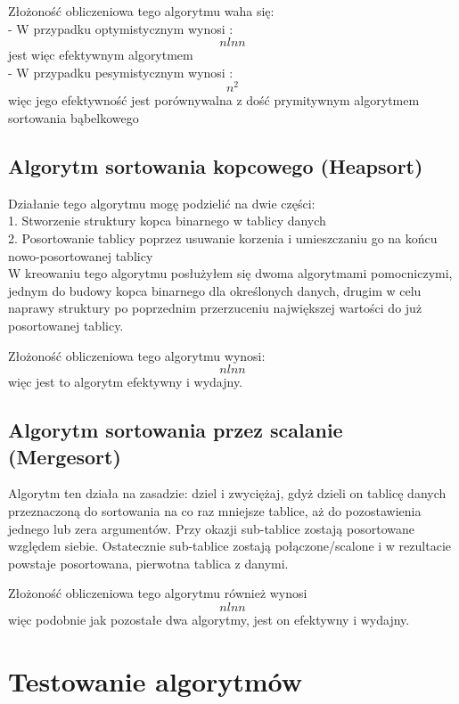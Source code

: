 \documentclass[a4paper,12pt]{article}
\begin{document}
Złożoność obliczeniowa tego algorytmu waha się: \\
- W przypadku optymistycznym wynosi : \begin{equation*}n ln n \end{equation*} jest więc efektywnym algorytmem \\
- W przypadku pesymistycznym wynosi : \begin{equation*} n^2 \end{equation*} więc jego efektywność jest porównywalna z dość prymitywnym algorytmem sortowania bąbelkowego

\subsection{Algorytm sortowania kopcowego (Heapsort)}

Działanie tego algorytmu mogę podzielić na dwie części: \\
1. Stworzenie struktury kopca binarnego w tablicy danych\\
2. Posortowanie tablicy poprzez usuwanie korzenia i umieszczaniu go na końcu nowo-posortowanej tablicy\\

W kreowaniu tego algorytmu posłużyłem się dwoma algorytmami pomocniczymi, jednym do budowy kopca binarnego dla określonych danych, drugim w celu naprawy struktury
po poprzednim przerzuceniu największej wartości do już posortowanej tablicy.

Złożoność obliczeniowa tego algorytmu wynosi: \[n ln n\] więc jest to algorytm efektywny i wydajny.

\subsection{Algorytm sortowania przez scalanie (Mergesort)}

Algorytm ten działa na zasadzie: dziel i zwyciężaj, gdyż dzieli on tablicę danych przeznaczoną do sortowania na co raz mniejsze tablice, aż do pozostawienia jednego
lub zera argumentów. Przy okazji sub-tablice zostają posortowane względem siebie. Ostatecznie sub-tablice zostają połączone/scalone i w rezultacie powstaje posortowana, pierwotna tablica z danymi. 

Złożoność obliczeniowa tego algorytmu również wynosi \[ n ln n\] więc podobnie jak pozostałe dwa algorytmy, jest on efektywny i wydajny.

\section{Testowanie algorytmów}
\end{document}
